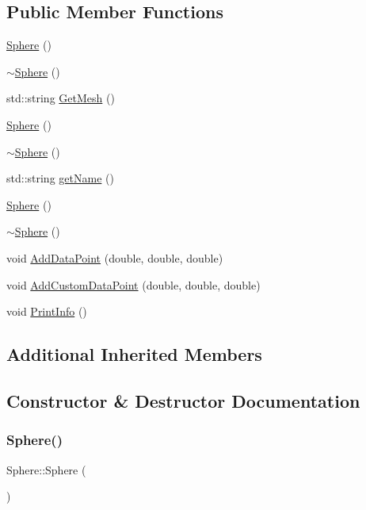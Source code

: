 \subsection*{Public Member Functions}
\begin{DoxyCompactItemize}
\item 
\mbox{\hyperlink{class_sphere_a890a63ff583cb88e7ec4e840b4ef5eb9}{Sphere}} ()
\item 
\mbox{\hyperlink{class_sphere_a569c071e50a3e11f678630ee1a17737e}{$\sim$\+Sphere}} ()
\item 
std\+::string \mbox{\hyperlink{class_sphere_afd7c86e5319c93163781df0e44cbfd49}{Get\+Mesh}} ()
\item 
\mbox{\hyperlink{class_sphere_a890a63ff583cb88e7ec4e840b4ef5eb9}{Sphere}} ()
\item 
\mbox{\hyperlink{class_sphere_a569c071e50a3e11f678630ee1a17737e}{$\sim$\+Sphere}} ()
\item 
std\+::string \mbox{\hyperlink{class_sphere_a173e667086ecd8b9d972e1d6f9885d9d}{get\+Name}} ()
\item 
\mbox{\hyperlink{class_sphere_a890a63ff583cb88e7ec4e840b4ef5eb9}{Sphere}} ()
\item 
\mbox{\hyperlink{class_sphere_a569c071e50a3e11f678630ee1a17737e}{$\sim$\+Sphere}} ()
\item 
void \mbox{\hyperlink{class_sphere_a6ee40854809d5d82480eabdbd677432f}{Add\+Data\+Point}} (double, double, double)
\item 
void \mbox{\hyperlink{class_sphere_a5990e060e4c7244b7fc57f0c2f675bf1}{Add\+Custom\+Data\+Point}} (double, double, double)
\item 
void \mbox{\hyperlink{class_sphere_ac985fbbf5615eeec9252d2e6e9fc7fdf}{Print\+Info}} ()
\end{DoxyCompactItemize}
\subsection*{Additional Inherited Members}


\subsection{Constructor \& Destructor Documentation}
\mbox{\label{class_sphere_a890a63ff583cb88e7ec4e840b4ef5eb9}} 
\subsubsection{\texorpdfstring{Sphere()}{Sphere()}\hspace{0.1cm}{\footnotesize\ttfamily [1/3]}}
{\footnotesize\ttfamily Sphere\+::\+Sphere (\begin{DoxyParamCaption}{ }\end{DoxyParamCaption})}

